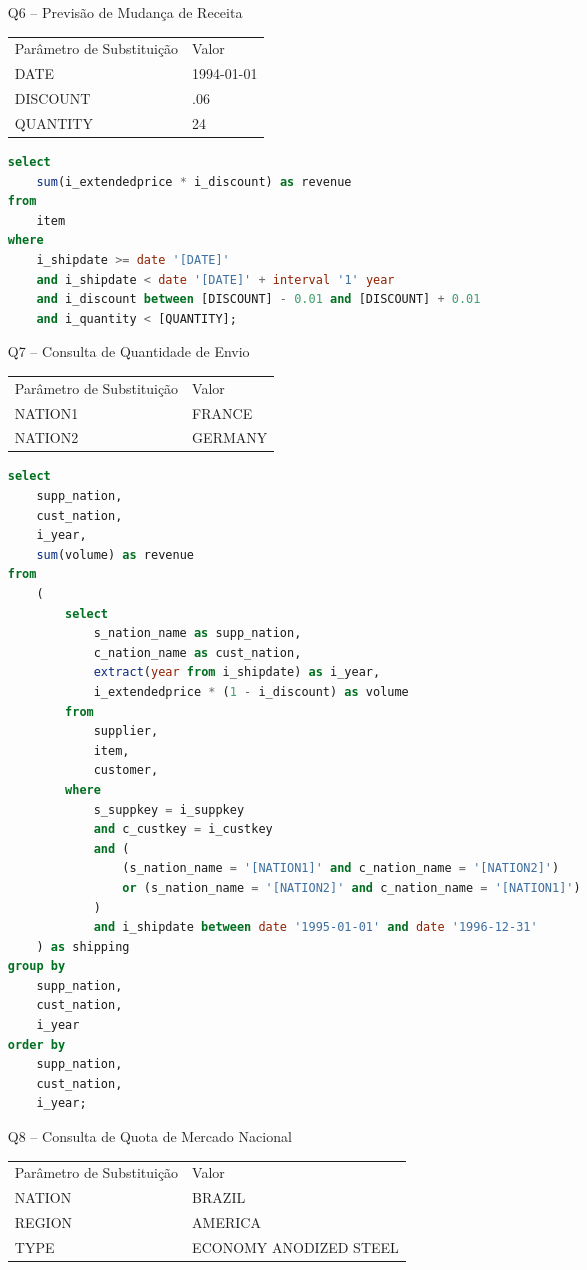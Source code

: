 \begin{enumerate}
\item[Q6 --] Previsão de Mudança de Receita

\begin{tabular}{ll}
	Parâmetro de Substituição & Valor\\
	DATE & 1994-01-01\\
	DISCOUNT & .06\\
	QUANTITY & 24\\
\end{tabular}

	\begin{lstlisting}[language=SQL]
select
	sum(i_extendedprice * i_discount) as revenue
from
	item
where
	i_shipdate >= date '[DATE]'
	and i_shipdate < date '[DATE]' + interval '1' year
	and i_discount between [DISCOUNT] - 0.01 and [DISCOUNT] + 0.01
	and i_quantity < [QUANTITY];
	\end{lstlisting}
	
\item[Q7 --] Consulta de Quantidade de Envio

\begin{tabular}{ll}
	Parâmetro de Substituição & Valor\\
	NATION1 & FRANCE\\
	NATION2 & GERMANY\\
\end{tabular}

	\begin{lstlisting}[language=SQL]
select
	supp_nation,
	cust_nation,
	i_year,
	sum(volume) as revenue
from
	(
		select
			s_nation_name as supp_nation,
			c_nation_name as cust_nation,
			extract(year from i_shipdate) as i_year,
			i_extendedprice * (1 - i_discount) as volume
		from
			supplier,
			item,
			customer,
		where
			s_suppkey = i_suppkey
			and c_custkey = i_custkey
			and (
				(s_nation_name = '[NATION1]' and c_nation_name = '[NATION2]')
				or (s_nation_name = '[NATION2]' and c_nation_name = '[NATION1]')
			)
			and i_shipdate between date '1995-01-01' and date '1996-12-31'
	) as shipping
group by
	supp_nation,
	cust_nation,
	i_year
order by
	supp_nation,
	cust_nation,
	i_year;
\end{lstlisting}

\item[Q8 --] Consulta de Quota de Mercado Nacional

\begin{tabular}{ll}
	Parâmetro de Substituição & Valor\\
	NATION & BRAZIL\\
	REGION & AMERICA\\
	TYPE &  ECONOMY ANODIZED STEEL\\
\end{tabular}


\end{enumerate}
